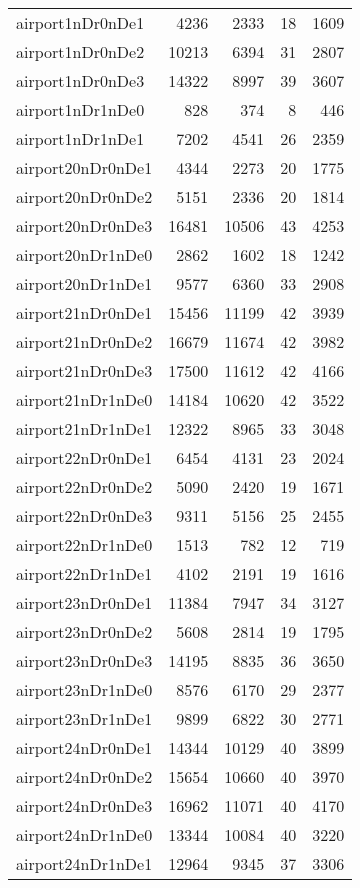 \begin{longtable}{lrrrr}
airport1nDr0nDe1 & 4236 & 2333 & 18 & 1609 \\
airport1nDr0nDe2 & 10213 & 6394 & 31 & 2807 \\
airport1nDr0nDe3 & 14322 & 8997 & 39 & 3607 \\
airport1nDr1nDe0 & 828 & 374 & 8 & 446 \\
airport1nDr1nDe1 & 7202 & 4541 & 26 & 2359 \\
airport20nDr0nDe1 & 4344 & 2273 & 20 & 1775 \\
airport20nDr0nDe2 & 5151 & 2336 & 20 & 1814 \\
airport20nDr0nDe3 & 16481 & 10506 & 43 & 4253 \\
airport20nDr1nDe0 & 2862 & 1602 & 18 & 1242 \\
airport20nDr1nDe1 & 9577 & 6360 & 33 & 2908 \\
airport21nDr0nDe1 & 15456 & 11199 & 42 & 3939 \\
airport21nDr0nDe2 & 16679 & 11674 & 42 & 3982 \\
airport21nDr0nDe3 & 17500 & 11612 & 42 & 4166 \\
airport21nDr1nDe0 & 14184 & 10620 & 42 & 3522 \\
airport21nDr1nDe1 & 12322 & 8965 & 33 & 3048 \\
airport22nDr0nDe1 & 6454 & 4131 & 23 & 2024 \\
airport22nDr0nDe2 & 5090 & 2420 & 19 & 1671 \\
airport22nDr0nDe3 & 9311 & 5156 & 25 & 2455 \\
airport22nDr1nDe0 & 1513 & 782 & 12 & 719 \\
airport22nDr1nDe1 & 4102 & 2191 & 19 & 1616 \\
airport23nDr0nDe1 & 11384 & 7947 & 34 & 3127 \\
airport23nDr0nDe2 & 5608 & 2814 & 19 & 1795 \\
airport23nDr0nDe3 & 14195 & 8835 & 36 & 3650 \\
airport23nDr1nDe0 & 8576 & 6170 & 29 & 2377 \\
airport23nDr1nDe1 & 9899 & 6822 & 30 & 2771 \\
airport24nDr0nDe1 & 14344 & 10129 & 40 & 3899 \\
airport24nDr0nDe2 & 15654 & 10660 & 40 & 3970 \\
airport24nDr0nDe3 & 16962 & 11071 & 40 & 4170 \\
airport24nDr1nDe0 & 13344 & 10084 & 40 & 3220 \\
airport24nDr1nDe1 & 12964 & 9345 & 37 & 3306 \\

\end{longtable}
